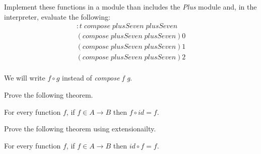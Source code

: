 \documentclass[11pt]{article}
\begin{document}
\begin{problem}
Implement these functions in a module than includes the {\it{Plus}} module and,
in the interpreter, evaluate the following:
\[\begin{array}{l}
:t\; compose\; plusSeven\; plusSeven \\
(compose\; plusSeven\; plusSeven) 0 \\
(compose\; plusSeven\; plusSeven) 1 \\
(compose\; plusSeven\; plusSeven) 2 \\
\end{array}\]
\end{problem}

We will write $f \circ g$ instead of {\it{compose f g}}.

\begin{problem}
Prove the following theorem. 

\goodbreak{} For every  function $f$, if $ f\in A \rightarrow B$ then $f \circ id = f$.

\end{problem}


\begin{problem}
Prove the following theorem using extensionailty.

\goodbreak{} For every  function $f$, if $ f\in A \rightarrow B$ then $id  \circ f = f$.

\end{problem}
\end{document}
